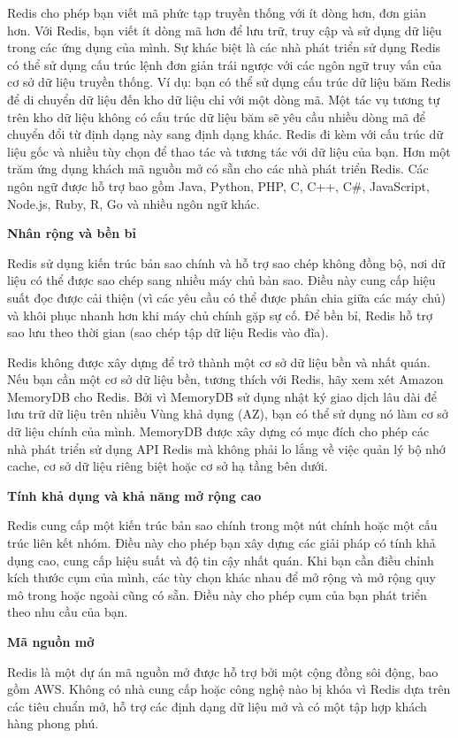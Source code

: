 Redis cho phép bạn viết mã phức tạp truyền thống với ít dòng hơn, đơn giản hơn. Với Redis, bạn viết ít dòng mã hơn để lưu trữ, truy cập và sử dụng dữ liệu trong các ứng dụng của mình. Sự khác biệt là các nhà phát triển sử dụng Redis có thể sử dụng cấu trúc lệnh đơn giản trái ngược với các ngôn ngữ truy vấn của cơ sở dữ liệu truyền thống. Ví dụ: bạn có thể sử dụng cấu trúc dữ liệu băm Redis để di chuyển dữ liệu đến kho dữ liệu chỉ với một dòng mã. Một tác vụ tương tự trên kho dữ liệu không có cấu trúc dữ liệu băm sẽ yêu cầu nhiều dòng mã để chuyển đổi từ định dạng này sang định dạng khác. Redis đi kèm với cấu trúc dữ liệu gốc và nhiều tùy chọn để thao tác và tương tác với dữ liệu của bạn. Hơn một trăm ứng dụng khách mã nguồn mở có sẵn cho các nhà phát triển Redis. Các ngôn ngữ được hỗ trợ bao gồm Java, Python, PHP, C, C++, C\#, JavaScript, Node.js, Ruby, R, Go và nhiều ngôn ngữ khác.

\textbf{Nhân rộng và bền bỉ}

Redis sử dụng kiến trúc bản sao chính và hỗ trợ sao chép không đồng bộ, nơi dữ liệu có thể được sao chép sang nhiều máy chủ bản sao. Điều này cung cấp hiệu suất đọc được cải thiện (vì các yêu cầu có thể được phân chia giữa các máy chủ) và khôi phục nhanh hơn khi máy chủ chính gặp sự cố. Để bền bỉ, Redis hỗ trợ sao lưu theo thời gian (sao chép tập dữ liệu Redis vào đĩa).

Redis không được xây dựng để trở thành một cơ sở dữ liệu bền và nhất quán. Nếu bạn cần một cơ sở dữ liệu bền, tương thích với Redis, hãy xem xét Amazon MemoryDB cho Redis. Bởi vì MemoryDB sử dụng nhật ký giao dịch lâu dài để lưu trữ dữ liệu trên nhiều Vùng khả dụng (AZ), bạn có thể sử dụng nó làm cơ sở dữ liệu chính của mình. MemoryDB được xây dựng có mục đích cho phép các nhà phát triển sử dụng API Redis mà không phải lo lắng về việc quản lý bộ nhớ cache, cơ sở dữ liệu riêng biệt hoặc cơ sở hạ tầng bên dưới.

\textbf{Tính khả dụng và khả năng mở rộng cao}

Redis cung cấp một kiến trúc bản sao chính trong một nút chính hoặc một cấu trúc liên kết nhóm. Điều này cho phép bạn xây dựng các giải pháp có tính khả dụng cao, cung cấp hiệu suất và độ tin cậy nhất quán. Khi bạn cần điều chỉnh kích thước cụm của mình, các tùy chọn khác nhau để mở rộng và mở rộng quy mô trong hoặc ngoài cũng có sẵn. Điều này cho phép cụm của bạn phát triển theo nhu cầu của bạn.

\textbf{Mã nguồn mở}

Redis là một dự án mã nguồn mở được hỗ trợ bởi một cộng đồng sôi động, bao gồm AWS. Không có nhà cung cấp hoặc công nghệ nào bị khóa vì Redis dựa trên các tiêu chuẩn mở, hỗ trợ các định dạng dữ liệu mở và có một tập hợp khách hàng phong phú.

